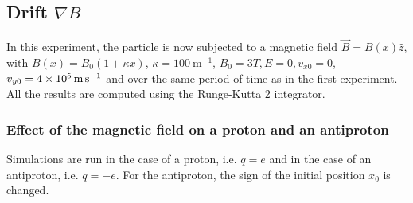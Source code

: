 \documentclass[a4paper,12pt,twoside]{article}
\begin{document}

\subsection{Drift $\nabla B$}
In this experiment, the particle is now subjected to a magnetic field $\vec{B}=B(x)\hat{z}$, with $B(x)=B_0(1+\kappa x)$, $\kappa=\SI{100}{\metre^{-1}}$, $B_0=3T, E=0, v_{x0}=0$, $v_{y0}=\SI{4d5}{\metre\per\second}$ and over the same period of time as in the first experiment.
All the results are computed using the Runge-Kutta 2 integrator.

\subsubsection{Effect of the magnetic field on a proton and an antiproton}

Simulations are run in the case of a proton, i.e. $q=e$ and in the case of an antiproton, i.e. $q=-e$. For the antiproton, the sign of the initial position $x_0$ is changed.
\end{document}
